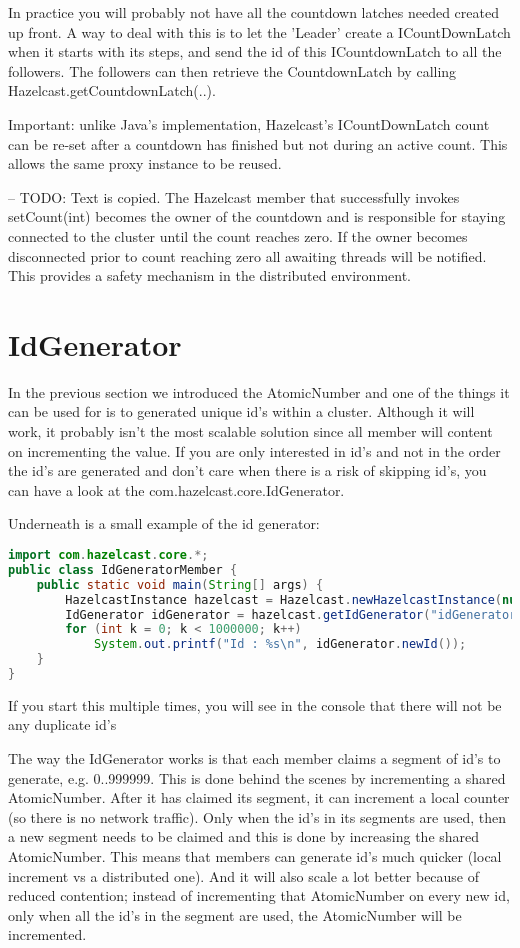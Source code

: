 In practice you will probably not have all the countdown latches needed created up front. A way to deal with this is to let the 'Leader' create a ICountDownLatch when it starts with its steps, and send the id of this ICountdownLatch to all the followers. The followers can then retrieve the CountdownLatch by calling Hazelcast.getCountdownLatch(..).

Important: unlike Java's implementation, Hazelcast's ICountDownLatch count can be re-set after a countdown has finished but not during an active count. This allows the same proxy instance to be reused.

-- TODO: Text is copied.
The Hazelcast member that successfully invokes setCount(int) becomes the owner of the countdown and is responsible for staying connected to the cluster until the count reaches zero. If the owner  becomes disconnected prior to count reaching zero all awaiting threads will be notified. This provides a safety mechanism in the distributed environment.

\section{IdGenerator}
In the previous section we introduced the AtomicNumber and one of the things it can be used for is to generated unique id's within a cluster. Although it will work, it probably isn't the most scalable solution since all member will content on incrementing the value. If you are only interested in id's and not in the order the id's are generated and don't care when there is a risk of skipping id's, you can have a look at the com.hazelcast.core.IdGenerator.

Underneath is a small example of the id generator:
\begin{lstlisting}[language=java]
import com.hazelcast.core.*;
public class IdGeneratorMember {
    public static void main(String[] args) {
        HazelcastInstance hazelcast = Hazelcast.newHazelcastInstance(null);
        IdGenerator idGenerator = hazelcast.getIdGenerator("idGenerator");
        for (int k = 0; k < 1000000; k++)
            System.out.printf("Id : %s\n", idGenerator.newId());
    }
}
\end{lstlisting}
If you start this multiple times, you will see in the console that there will not be any duplicate id's

The way the IdGenerator works is that each member claims a segment of id's to generate, e.g. 0..999999. This is done behind the scenes by incrementing a shared AtomicNumber. After it has claimed its segment, it can increment a local counter (so there is no network traffic). Only when the id's in its segments are used, then a new segment needs to be claimed and this is done by increasing the shared AtomicNumber. This means that members can generate id's much quicker (local increment vs a distributed one). And it will also scale a lot better because of reduced contention; instead of incrementing that AtomicNumber on every new id, only when all the id's in the segment are used, the AtomicNumber will be incremented.

